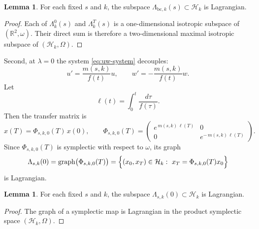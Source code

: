 \documentclass[11pt]{article}
\theoremstyle{definition}
\newtheorem{lemma}[theorem]{Lemma}
\numberwithin{equation}{section}
\begin{document}
\begin{lemma}
\label{lem:bc-lagrangian}
For each fixed \(s\) and \(k\), the subspace \(\Lambda_{\mathrm{bc},k}(s)\subset\mathcal H_k\) is Lagrangian.
\end{lemma}

\begin{proof}
Each of \(\Lambda_k^0(s)\) and \(\Lambda_k^T(s)\) is a one-dimensional isotropic subspace of \((\mathbb R^2,\omega)\). Their direct sum is therefore a two-dimensional maximal isotropic subspace of \((\mathcal H_k,\Omega)\).
\end{proof}

Second, at \(\lambda=0\) the system \eqref{eq:uw-system} decouples:
\begin{equation}
u'=\frac{m(s,k)}{f(t)}u,
\qquad
w'=-\frac{m(s,k)}{f(t)}w.
\end{equation}
Let
\begin{equation}\label{eq:ell_clean}
\ell(t)=\int_0^t \frac{d\tau}{f(\tau)}.
\end{equation}
Then the transfer matrix is
\begin{equation}\label{eq:transfer_clean}
x(T)=\Phi_{s,k,0}(T)\,x(0),
\qquad
\Phi_{s,k,0}(T)=
\begin{pmatrix}
e^{\,m(s,k)\,\ell(T)}&0\\
0&e^{-\,m(s,k)\,\ell(T)}
\end{pmatrix}.
\end{equation}
Since \(\Phi_{s,k,0}(T)\) is symplectic with respect to \(\omega\), its graph
\begin{equation}\label{eq:Lambda_cauchy_clean}
\Lambda_{s,k}(0)
=
\operatorname{graph}\bigl(\Phi_{s,k,0}(T)\bigr)
=
\Bigl\{(x_0,x_T)\in\mathcal H_k:\ x_T=\Phi_{s,k,0}(T)x_0\Bigr\}
\end{equation}
is Lagrangian.

\begin{lemma}
\label{lem:cauchy-lagrangian}
For each fixed \(s\) and \(k\), the subspace \(\Lambda_{s,k}(0)\subset\mathcal H_k\) is Lagrangian.
\end{lemma}

\begin{proof}
The graph of a symplectic map is Lagrangian in the product symplectic space \((\mathcal H_k,\Omega)\).
\end{proof}
\end{document}
